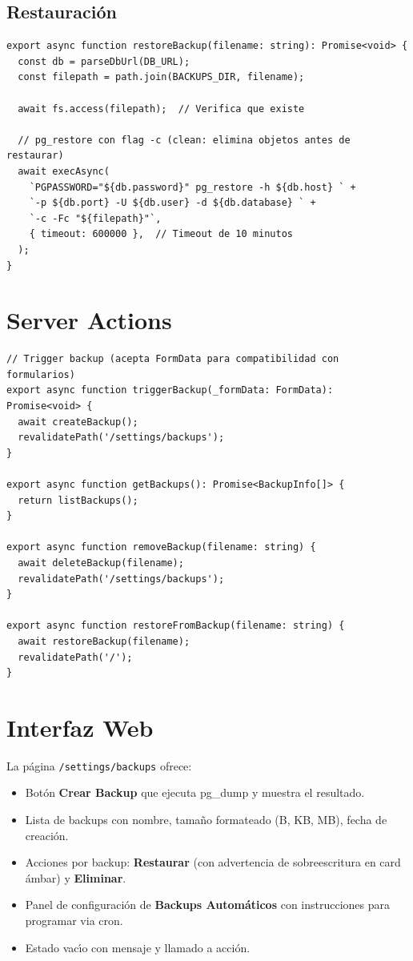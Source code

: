 \subsection{Restauraci\'on}

\begin{lstlisting}[style=typescript, caption=Restauracion de backup]
export async function restoreBackup(filename: string): Promise<void> {
  const db = parseDbUrl(DB_URL);
  const filepath = path.join(BACKUPS_DIR, filename);

  await fs.access(filepath);  // Verifica que existe

  // pg_restore con flag -c (clean: elimina objetos antes de restaurar)
  await execAsync(
    `PGPASSWORD="${db.password}" pg_restore -h ${db.host} ` +
    `-p ${db.port} -U ${db.user} -d ${db.database} ` +
    `-c -Fc "${filepath}"`,
    { timeout: 600000 },  // Timeout de 10 minutos
  );
}
\end{lstlisting}

\section{Server Actions}

\begin{lstlisting}[style=typescript, caption=Backups - Server actions]
// Trigger backup (acepta FormData para compatibilidad con formularios)
export async function triggerBackup(_formData: FormData): Promise<void> {
  await createBackup();
  revalidatePath('/settings/backups');
}

export async function getBackups(): Promise<BackupInfo[]> {
  return listBackups();
}

export async function removeBackup(filename: string) {
  await deleteBackup(filename);
  revalidatePath('/settings/backups');
}

export async function restoreFromBackup(filename: string) {
  await restoreBackup(filename);
  revalidatePath('/');
}
\end{lstlisting}

\section{Interfaz Web}

La p\'agina \texttt{/settings/backups} ofrece:

\begin{itemize}[leftmargin=*]
    \item Bot\'on \textbf{Crear Backup} que ejecuta pg\_dump y muestra
          el resultado.
    \item Lista de backups con nombre, tama\~no formateado (B, KB, MB),
          fecha de creaci\'on.
    \item Acciones por backup: \textbf{Restaurar} (con advertencia de
          sobreescritura en card \'ambar) y \textbf{Eliminar}.
    \item Panel de configuraci\'on de \textbf{Backups Autom\'aticos}
          con instrucciones para programar via cron.
    \item Estado vac\'{\i}o con mensaje y llamado a acci\'on.
\end{itemize}


